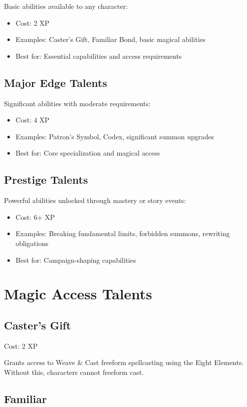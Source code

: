 \documentclass[11pt,twoside,openany]{book}
\begin{document}
Basic abilities available to any character:
\begin{itemize}
\item Cost: 2 XP
\item Examples: Caster's Gift, Familiar Bond, basic magical abilities
\item Best for: Essential capabilities and access requirements
\end{itemize}

\subsection*{Major Edge Talents}

Significant abilities with moderate requirements:
\begin{itemize}
\item Cost: 4 XP
\item Examples: Patron's Symbol, Codex, significant summon upgrades
\item Best for: Core specialization and magical access
\end{itemize}

\subsection*{Prestige Talents}

Powerful abilities unlocked through mastery or story events:
\begin{itemize}
\item Cost: 6+ XP
\item Examples: Breaking fundamental limits, forbidden summons, rewriting obligations
\item Best for: Campaign-shaping capabilities
\end{itemize}

\section*{Magic Access Talents} 

\subsection*{Caster's Gift}

Cost: 2 XP

Grants access to Weave \& Cast freeform spellcasting using the Eight Elements. Without this, characters cannot freeform cast.

\subsection*{Familiar}
\end{document}
